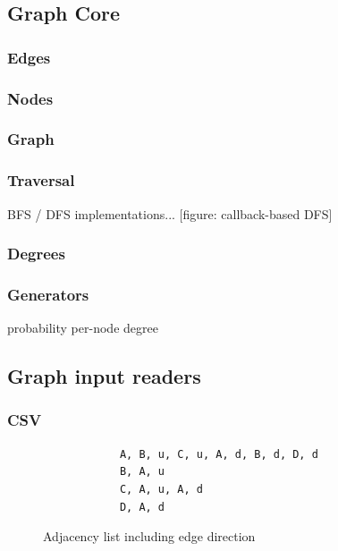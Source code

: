 	\subsection{Graph Core}
	\label{ssect:graph_core}
	
		\subsubsection{Edges}
		\label{sssection: core_edges}
		
		\subsubsection{Nodes}
		\label{sssection: core_nodes}
		
		\subsubsection{Graph}
		\label{sssection: core_graph}
		
		\subsubsection{Traversal}
		\label{sssection: core_traveral}
		
		BFS / DFS implementations... [figure: callback-based DFS]
		
		\subsubsection{Degrees}
		\label{sssection: core_degrees}
		
		\subsubsection{Generators}
		\label{sssection: core_}
		
		probability
		per-node degree
	
	
	\subsection{Graph input readers}
	\label{ssect:input_output}
	
		\subsubsection{CSV}
		\label{sssection: io_csv}
		
		
		\begin{figure}[ht]
			\begin{lstlisting}
			A, B, u, C, u, A, d, B, d, D, d
			B, A, u
			C, A, u, A, d
			D, A, d
			\end{lstlisting}
			\caption{Adjacency list including edge direction}
			\label{fig:adj_list_direction}
		\end{figure}
		
